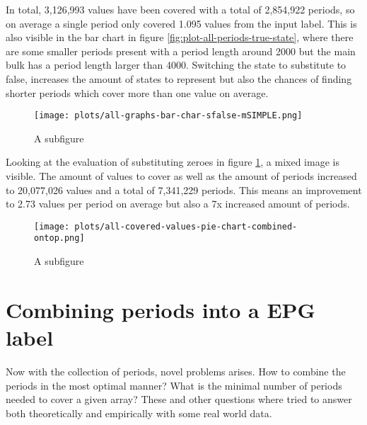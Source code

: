 In total, 3,126,993 values have been covered with a total of 2,854,922 periods, so on average a single period only covered 1.095 values from the input label. This is also visible in the bar chart in figure \ref{fig:plot-all-periods-true-state}, where there are some smaller periods present with a period length around 2000 but the main bulk has a period length larger than 4000. Switching the state to substitute to false, increases the amount of states to represent but also the chances of finding shorter periods which cover more than one value on average.

\begin{figure}[h]
	\texttt{[image: plots/all-graphs-bar-char-sfalse-mSIMPLE.png]}
	\caption{A subfigure}
	\label{fig:plot-all-periods-false-state}
\end{figure}

Looking at the evaluation of substituting zeroes in figure \ref{fig:plot-all-periods-false-state}, a mixed image is visible. The amount of values to cover as well as the amount of periods increased to 20,077,026 values and a total of 7,341,229 periods. This means an improvement to 2.73 values per period on average but also a 7x increased amount of periods.

\begin{figure}[h]
	\texttt{[image: plots/all-covered-values-pie-chart-combined-ontop.png]}
	\caption{A subfigure}
	\label{fig:sub2}
\end{figure}



\newpage

\section{Combining periods into a EPG label}

Now with the collection of periods, novel problems arises. How to combine the periods in the most optimal manner? What is the minimal number of periods needed to cover a given array? These and other questions where tried to answer both theoretically and empirically with some real world data.

